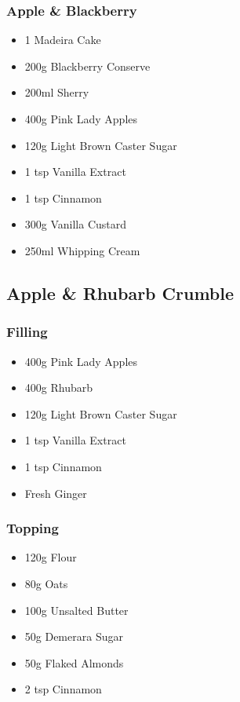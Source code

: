 \documentclass[11pt, english]{article}
\begin{document}
		\subsubsection*{Apple \& Blackberry}

	\begin{itemize}
        \setlength\itemsep{0cm}
                \item 1 Madeira Cake
		\item 200g Blackberry Conserve 
		\item 200ml Sherry
		\item 400g Pink Lady Apples
		\item 120g Light Brown Caster Sugar
		\item 1 tsp Vanilla Extract
		\item 1 tsp Cinnamon
		\item 300g Vanilla Custard
		\item 250ml Whipping Cream
        \end{itemize}

\newpage

	\subsection{Apple \& Rhubarb Crumble}

		\subsubsection*{Filling}

	\begin{itemize}
        \setlength\itemsep{0cm}
                \item 400g Pink Lady Apples
		\item 400g Rhubarb
		\item 120g Light Brown Caster Sugar
		\item 1 tsp Vanilla Extract
		\item 1 tsp Cinnamon
		\item Fresh Ginger
        \end{itemize}

		\subsubsection*{Topping}

	\begin{itemize}
        \setlength\itemsep{0cm}
                \item 120g Flour
		\item 80g Oats
		\item 100g Unsalted Butter
		\item 50g Demerara Sugar
		\item 50g Flaked Almonds
		\item 2 tsp Cinnamon
        \end{itemize}
\end{document}
